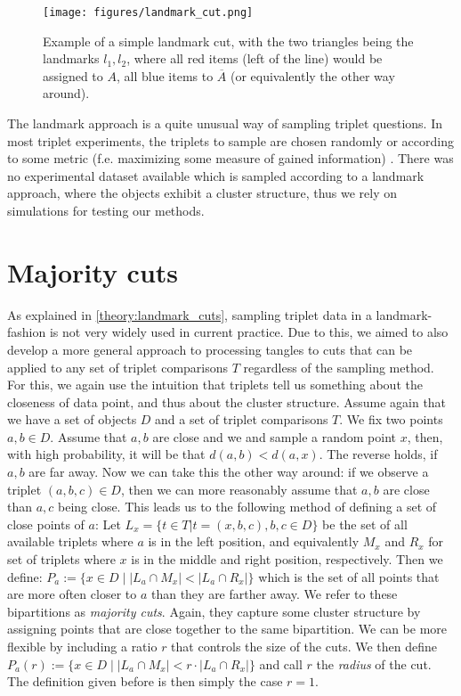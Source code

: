     \begin{figure}[ht]
        \centering
        \texttt{[image: figures/landmark\_cut.png]}
        \caption{Example of a simple landmark cut, with the two triangles being the landmarks $l_1, l_2$, where all red items (left of the line) 
        would be assigned to $A$, all blue items to $\overline{A}$ (or equivalently the other way around).}
        \label{fig:landmark_cut}
    \end{figure}

The landmark approach is a quite unusual way of sampling triplet questions.
In most triplet experiments, the triplets to sample are chosen randomly \cite{kleindessnerLensDepthFunction2017, haghiriEstimationPerceptualScales2020} 
or according to some metric (f.e. maximizing some measure of gained information) \cite{roadsEnrichingImageNetHuman2021}. 
There was no experimental dataset available which is sampled according to a landmark approach, where the objects exhibit a cluster structure, thus we rely on simulations
for testing our methods.

\section{Majority cuts}
As explained in \autoref{theory:landmark_cuts}, sampling triplet data in a landmark-fashion is not very widely used in current practice. Due to this, we aimed
to also develop a more general approach to processing tangles to cuts that can be applied to any set of triplet comparisons $T$ regardless of the sampling method.
For this, we again use the intuition that triplets tell us something about the closeness of data point, and thus about the cluster structure. Assume again
that we have a set of objects $D$ and a set of triplet comparisons $T$. We fix two points $a,b \in D$. Assume that $a,b$ are close and we and sample a random point $x$,
then, with high probability, it will be that $d(a,b) < d(a,x)$. The reverse holds, if $a,b$ are far away. Now we can take this the other way around: 
if we observe a triplet $(a,b,c) \in D$, then we can more reasonably assume that $a,b$ are close than $a,c$ being close. This leads us to the following method of defining
a set of close points of $a$: Let $L_x = \{t \in T | t = (x, b,c), b,c \in D\}$ be the set of all available triplets where $a$ is in the left position, and equivalently $M_x$ and $R_x$ 
for set of triplets where $x$ is in the middle and right position, respectively. Then we define: $P_a := \{x \in D \mid \left|   L_a \cap M_x\right| < \left| L_a \cap R_x \right| \}$
which is the set of all points that are more often closer to $a$ than they are farther away. We refer to these bipartitions as \textit{majority cuts}. Again, they capture
some cluster structure by assigning points that are close together to the same bipartition. We can be more flexible by including a ratio $r$ that controls the size of the cuts. We then define
$P_a(r) := \{x \in D \mid \left|   L_a \cap M_x\right| < r \cdot \left| L_a \cap R_x \right| \}$ and call $r$ the \textit{radius} of the cut. The definition given before is then simply the 
case $r = 1$. \\

